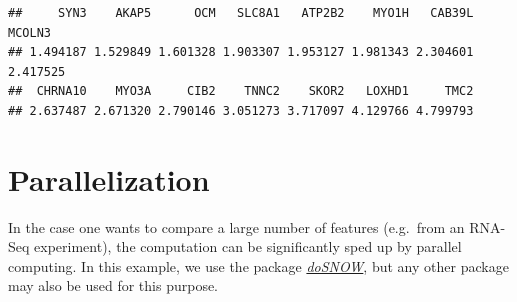 \documentclass[]{book}
\newenvironment{Shaded}{\begin{snugshade}}{\end{snugshade}}
\newcommand{\KeywordTok}[1]{\textcolor[rgb]{0.13,0.29,0.53}{\textbf{#1}}}
\newcommand{\DataTypeTok}[1]{\textcolor[rgb]{0.13,0.29,0.53}{#1}}
\newcommand{\DecValTok}[1]{\textcolor[rgb]{0.00,0.00,0.81}{#1}}
\newcommand{\StringTok}[1]{\textcolor[rgb]{0.31,0.60,0.02}{#1}}
\newcommand{\CommentTok}[1]{\textcolor[rgb]{0.56,0.35,0.01}{\textit{#1}}}
\newcommand{\OperatorTok}[1]{\textcolor[rgb]{0.81,0.36,0.00}{\textbf{#1}}}
\newcommand{\NormalTok}[1]{#1}
\theoremstyle{definition}
\theoremstyle{definition}
\theoremstyle{definition}
\theoremstyle{remark}
\begin{document}
\begin{verbatim}
##     SYN3    AKAP5      OCM   SLC8A1   ATP2B2    MYO1H   CAB39L   MCOLN3 
## 1.494187 1.529849 1.601328 1.903307 1.953127 1.981343 2.304601 2.417525 
##  CHRNA10    MYO3A     CIB2    TNNC2    SKOR2   LOXHD1     TMC2 
## 2.637487 2.671320 2.790146 3.051273 3.717097 4.129766 4.799793
\end{verbatim}

\section{Parallelization}\label{parallelization}

In the case one wants to compare a large number of features (e.g.~from
an RNA-Seq experiment), the computation can be significantly sped up by
parallel computing. In this example, we use the package
\emph{\href{https://CRAN.R-project.org/package=doSNOW}{doSNOW}}, but any
other package may also be used for this purpose.

\begin{Shaded}
\end{Shaded}
\end{document}
